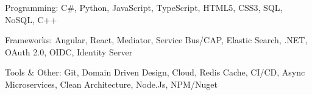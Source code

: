 \vspace{-1\baselineskip}
\begin{cvskills}
  \cvskill
    {Programming:} %
    {C\#, Python, JavaScript, TypeScript, HTML5, CSS3, SQL, NoSQL, C++} %

  \cvskill
    {Frameworks:} %
    {Angular, React, Mediator, Service Bus/CAP, Elastic Search, .NET, OAuth 2.0, OIDC, Identity Server} %

  \cvskill
    {Tools \& Other:} %
    {Git, Domain Driven Design, Cloud, Redis Cache, CI/CD, Async Microservices, Clean Architecture, Node.Js, NPM/Nuget} %

\end{cvskills}
\vspace{-0.5\baselineskip}